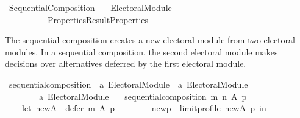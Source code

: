 %
\begin{isabellebody}%
%
%
\isadelimdocument
\isanewline
%
\endisadelimdocument
%
\isatagdocument
\isanewline
\isanewline
%
\isamarkuptrue%
%
\endisatagdocument
{\isafolddocument}%
%
\isadelimdocument
%
\endisadelimdocument
%
\isadelimtheory
%
\endisadelimtheory
%
\isatagtheory
{}\isamarkupfalse%
\ Sequential{\isacharunderscore}{\kern0pt}Composition\isanewline
\ \ \ {\isachardoublequoteopen}{\isachardot}{\kern0pt}{\isachardot}{\kern0pt}{\isacharslash}{\kern0pt}Electoral{\isacharunderscore}{\kern0pt}Module{\isachardoublequoteclose}\isanewline
\ \ \ \ \ \ \ \ \ \ {\isachardoublequoteopen}{\isachardot}{\kern0pt}{\isachardot}{\kern0pt}{\isacharslash}{\kern0pt}{\isachardot}{\kern0pt}{\isachardot}{\kern0pt}{\isacharslash}{\kern0pt}Properties{\isacharslash}{\kern0pt}Result{\isacharunderscore}{\kern0pt}Properties{\isachardoublequoteclose}\isanewline
\isanewline
{}%
\endisatagtheory
{\isafoldtheory}%
%
\isadelimtheory
%
\endisadelimtheory
%
\begin{isamarkuptext}%
The sequential composition creates a new electoral module from
two electoral modules. In a sequential composition, the second
electoral module makes decisions over alternatives deferred by
the first electoral module.%
\end{isamarkuptext}\isamarkuptrue%
%
\isadelimdocument
%
\endisadelimdocument
%
\isatagdocument
%
\isamarkuptrue%
%
\endisatagdocument
{\isafolddocument}%
%
\isadelimdocument
%
\endisadelimdocument
{}\isamarkupfalse%
\ sequential{\isacharunderscore}{\kern0pt}composition\ {\isacharcolon}{\kern0pt}{\isacharcolon}{\kern0pt}\ {\isachardoublequoteopen}{\isacharprime}{\kern0pt}a\ Electoral{\isacharunderscore}{\kern0pt}Module\ {\isasymRightarrow}\ {\isacharprime}{\kern0pt}a\ Electoral{\isacharunderscore}{\kern0pt}Module\ {\isasymRightarrow}\isanewline
\ \ \ \ \ \ \ \ {\isacharprime}{\kern0pt}a\ Electoral{\isacharunderscore}{\kern0pt}Module{\isachardoublequoteclose}\ \isanewline
\ \ {\isachardoublequoteopen}sequential{\isacharunderscore}{\kern0pt}composition\ m\ n\ A\ p\ {\isacharequal}{\kern0pt}\isanewline
\ \ \ \ {\isacharparenleft}{\kern0pt}let\ new{\isacharunderscore}{\kern0pt}A\ {\isacharequal}{\kern0pt}\ defer\ m\ A\ p{\isacharsemicolon}{\kern0pt}\isanewline
\ \ \ \ \ \ \ \ new{\isacharunderscore}{\kern0pt}p\ {\isacharequal}{\kern0pt}\ limit{\isacharunderscore}{\kern0pt}profile\ new{\isacharunderscore}{\kern0pt}A\ p\ in\ {\isacharparenleft}{\kern0pt}\isanewline

\end{isabellebody}
